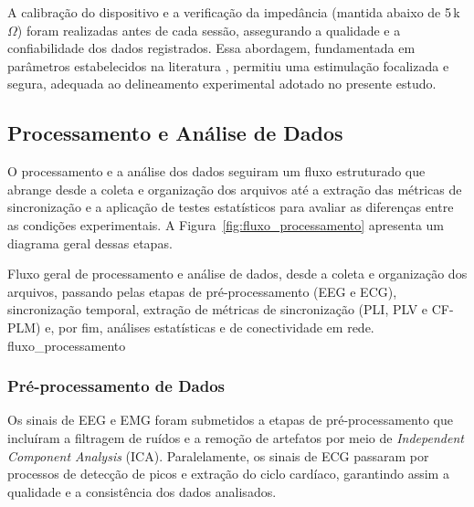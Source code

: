 
A calibração do dispositivo e a verificação da impedância (mantida abaixo de 5\,k$\Omega$) foram realizadas antes de cada sessão, assegurando a qualidade e a confiabilidade dos dados registrados. Essa abordagem, fundamentada em parâmetros estabelecidos na literatura \cite{datta2008transcranial, stagg2011physiological}, permitiu uma estimulação focalizada e segura, adequada ao delineamento experimental adotado no presente estudo.

\subsection{Processamento e Análise de Dados}
O processamento e a análise dos dados seguiram um fluxo estruturado que abrange desde a coleta e organização dos arquivos até a extração das métricas de sincronização e a aplicação de testes estatísticos para avaliar as diferenças entre as condições experimentais. A Figura~\ref{fig:fluxo_processamento} apresenta um diagrama geral dessas etapas.

{Fluxo geral de processamento e análise de dados, desde a coleta e organização dos arquivos, passando pelas etapas de pré-processamento (EEG e ECG), sincronização temporal, extração de métricas de sincronização (PLI, PLV e CF-PLM) e, por fim, análises estatísticas e de conectividade em rede.}
{fluxo_processamento}

\subsubsection{Pré-processamento de Dados}
Os sinais de EEG e EMG foram submetidos a etapas de pré-processamento que incluíram a filtragem de ruídos e a remoção de artefatos por meio de \textit{Independent Component Analysis} (ICA). Paralelamente, os sinais de ECG passaram por processos de detecção de picos e extração do ciclo cardíaco, garantindo assim a qualidade e a consistência dos dados analisados.

